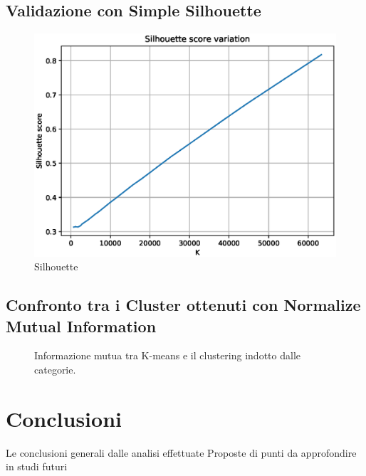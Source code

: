 \documentclass[
	12pt, %
	a4paper, %
	oneside, %
	headinclude,footinclude, %
	BCOR5mm, %
]{scrartcl}
\begin{document}
	\subsection{Validazione con Simple Silhouette}
		\begin{figure}[!htb]
			\centering
			\includegraphics[scale=.5]{../results/silhouette.eps}
			\caption{Silhouette}
			\label{fig:silhouette}
		\end{figure}
		
	\subsection{Confronto tra i Cluster ottenuti con Normalize Mutual Information}
		\begin{figure}[!htb]
			\centering
			\caption{Informazione mutua tra K-means e il clustering indotto dalle categorie.}
			\label{fig:NMI-kmeans-categories}
		\end{figure}
		
\section{Conclusioni}
	Le conclusioni generali dalle analisi effettuate
	Proposte di punti da approfondire in studi futuri

\end{document}
